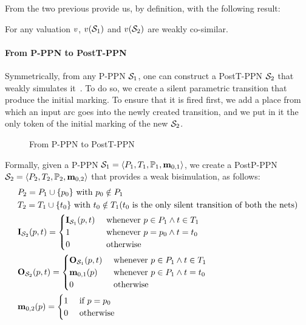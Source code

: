 From the two previous  provide us, by definition, with the following result:
\begin{lemm}
  \label{theo:cosimulation-p-ppn-postt-ppn}
  \label{theo:cosimulation-postt-ppn-p-ppn}
  For any valuation $\val$, $\val[{\namePPN[1]}]$ and $\val[{\namePPN[2]}]$ are weakly co-similar.
\end{lemm}


\paragraph{From P-PPN to PostT-PPN}
\label{sec:p-ppn-to-postt-ppn}

Symmetrically, from any P-PPN $\namePPN[1]$, one can construct a PostT-PPN $\namePPN[2]$ that weakly simulates it~\citep{David17}.
To do so, we create a silent parametric transition that produce the initial marking.
To ensure that it is fired first, we add a place from which an input arc goes into the newly created transition, and we put in it the only token of the initial marking of the new $\namePPN[2]$.

\begin{figure}[htbp]
  \centering
  
  \par
  \caption{From P-PPN to PostT-PPN}
  \label{fig:pppn-to-posttppn}
\end{figure}

Formally, given a P-PPN $\defPPN[1]$, we create a PostP-PPN $\defPPN[2]$ that provides a weak bisimulation, as follows:
\begin{align*}
  &\places_2 = \places_1 \cup           \{ p_0 \}
    \text{ with } p_0 \notin \places_1 \\
  &\transitions_2 = \transitions_1 \cup \{ t_0 \}
    \text{ with } t_0 \notin \transitions_1 \text{($t_0$ is  the only silent transition of both the nets)} \\
  &\inm[\namePPN[2]][p,t] = \begin{cases}
      \inm[\namePPN[1]][p,t] &\text{ whenever } p \in \places_1 \wedge t \in \transitions_1 \\
      1 &\text{ whenever } p = p_0 \wedge t = t_0 \\
      0 &\tothrw
    \end{cases} \\
  &\outm[\namePPN[2]][p,t] = \begin{cases}
      \outm[\namePPN[1]][p,t] &\text{ whenever } p \in \places_1 \wedge t \in \transitions_1 \\
      \mar_{0,1}(p) &\text{ whenever } p \in \places_1 \wedge t = t_0 \\
      0 &\tothrw
    \end{cases} \\
  &\mar_{0,2}(p) = \begin{cases}
      1 & \tif p = p_0 \\
      0 & \tothrw
    \end{cases}
\end{align*}

